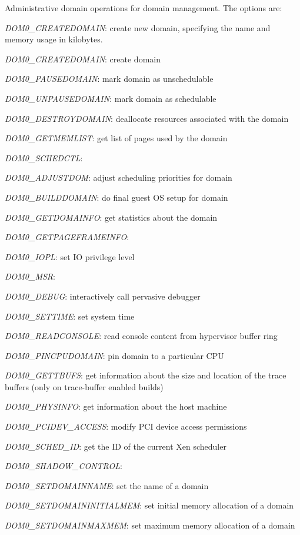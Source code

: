 \documentclass[11pt,twoside,final,openright]{xenstyle}
\begin{document}

Administrative domain operations for domain management. The options are:

{\it DOM0\_CREATEDOMAIN}: create new domain, specifying the name and memory usage
in kilobytes.

{\it DOM0\_CREATEDOMAIN}: create domain

{\it DOM0\_PAUSEDOMAIN}: mark domain as unschedulable

{\it DOM0\_UNPAUSEDOMAIN}: mark domain as schedulable

{\it DOM0\_DESTROYDOMAIN}: deallocate resources associated with the domain

{\it DOM0\_GETMEMLIST}: get list of pages used by the domain

{\it DOM0\_SCHEDCTL}:

{\it DOM0\_ADJUSTDOM}: adjust scheduling priorities for domain

{\it DOM0\_BUILDDOMAIN}: do final guest OS setup for domain

{\it DOM0\_GETDOMAINFO}: get statistics about the domain

{\it DOM0\_GETPAGEFRAMEINFO}:

{\it DOM0\_IOPL}: set IO privilege level

{\it DOM0\_MSR}:

{\it DOM0\_DEBUG}: interactively call pervasive debugger

{\it DOM0\_SETTIME}: set system time

{\it DOM0\_READCONSOLE}: read console content from hypervisor buffer ring

{\it DOM0\_PINCPUDOMAIN}: pin domain to a particular CPU

{\it DOM0\_GETTBUFS}: get information about the size and location of
                      the trace buffers (only on trace-buffer enabled builds)

{\it DOM0\_PHYSINFO}: get information about the host machine

{\it DOM0\_PCIDEV\_ACCESS}: modify PCI device access permissions

{\it DOM0\_SCHED\_ID}: get the ID of the current Xen scheduler

{\it DOM0\_SHADOW\_CONTROL}:

{\it DOM0\_SETDOMAINNAME}: set the name of a domain

{\it DOM0\_SETDOMAININITIALMEM}: set initial memory allocation of a domain

{\it DOM0\_SETDOMAINMAXMEM}: set maximum memory allocation of a domain
\end{document}
